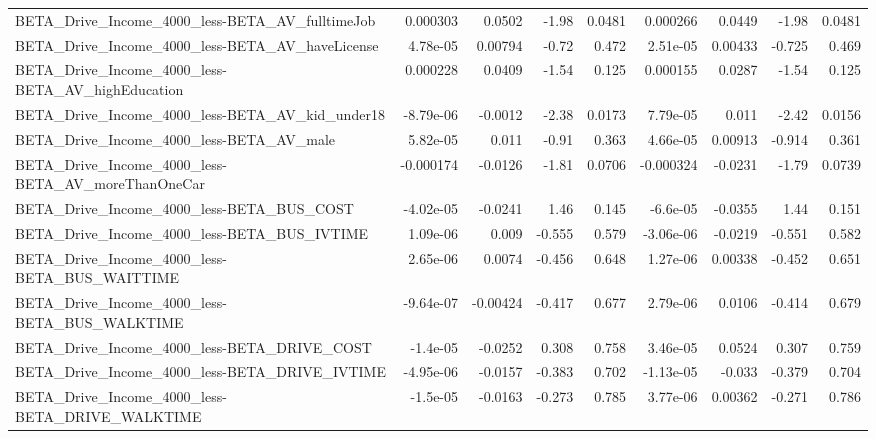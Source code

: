 \begin{tabular}{lrrrrrrrr}
BETA\_Drive\_Income\_4000\_less-BETA\_AV\_fulltimeJob    &    0.000303 &       0.0502 &    -1.98 &   0.0481 &   0.000266 &      0.0449 &        -1.98 &        0.0481 \\
BETA\_Drive\_Income\_4000\_less-BETA\_AV\_haveLicense    &    4.78e-05 &      0.00794 &    -0.72 &    0.472 &   2.51e-05 &     0.00433 &       -0.725 &         0.469 \\
BETA\_Drive\_Income\_4000\_less-BETA\_AV\_highEducation  &    0.000228 &       0.0409 &    -1.54 &    0.125 &   0.000155 &      0.0287 &        -1.54 &         0.125 \\
BETA\_Drive\_Income\_4000\_less-BETA\_AV\_kid\_under18    &   -8.79e-06 &      -0.0012 &    -2.38 &   0.0173 &   7.79e-05 &       0.011 &        -2.42 &        0.0156 \\
BETA\_Drive\_Income\_4000\_less-BETA\_AV\_male           &    5.82e-05 &        0.011 &    -0.91 &    0.363 &   4.66e-05 &     0.00913 &       -0.914 &         0.361 \\
BETA\_Drive\_Income\_4000\_less-BETA\_AV\_moreThanOneCar &   -0.000174 &      -0.0126 &    -1.81 &   0.0706 &  -0.000324 &     -0.0231 &        -1.79 &        0.0739 \\
BETA\_Drive\_Income\_4000\_less-BETA\_BUS\_COST          &   -4.02e-05 &      -0.0241 &     1.46 &    0.145 &   -6.6e-05 &     -0.0355 &         1.44 &         0.151 \\
BETA\_Drive\_Income\_4000\_less-BETA\_BUS\_IVTIME        &    1.09e-06 &        0.009 &   -0.555 &    0.579 &  -3.06e-06 &     -0.0219 &       -0.551 &         0.582 \\
BETA\_Drive\_Income\_4000\_less-BETA\_BUS\_WAITTIME      &    2.65e-06 &       0.0074 &   -0.456 &    0.648 &   1.27e-06 &     0.00338 &       -0.452 &         0.651 \\
BETA\_Drive\_Income\_4000\_less-BETA\_BUS\_WALKTIME      &   -9.64e-07 &     -0.00424 &   -0.417 &    0.677 &   2.79e-06 &      0.0106 &       -0.414 &         0.679 \\
BETA\_Drive\_Income\_4000\_less-BETA\_DRIVE\_COST        &    -1.4e-05 &      -0.0252 &    0.308 &    0.758 &   3.46e-05 &      0.0524 &        0.307 &         0.759 \\
BETA\_Drive\_Income\_4000\_less-BETA\_DRIVE\_IVTIME      &   -4.95e-06 &      -0.0157 &   -0.383 &    0.702 &  -1.13e-05 &      -0.033 &       -0.379 &         0.704 \\
BETA\_Drive\_Income\_4000\_less-BETA\_DRIVE\_WALKTIME    &    -1.5e-05 &      -0.0163 &   -0.273 &    0.785 &   3.77e-06 &     0.00362 &       -0.271 &         0.786 \\

\end{tabular}
